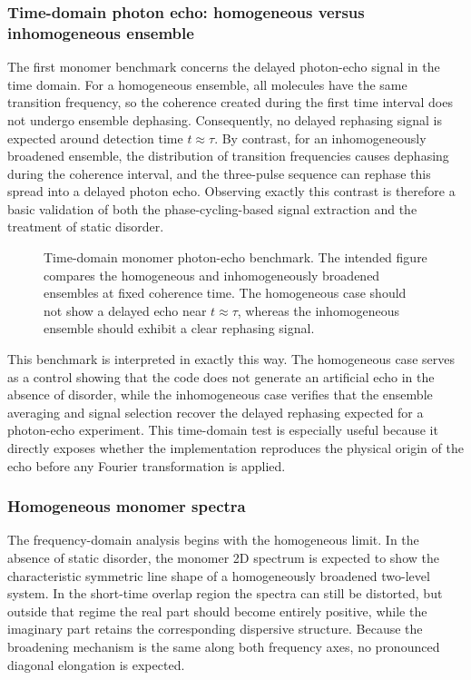 \subsubsection{Time-domain photon echo: homogeneous versus inhomogeneous ensemble}

The first monomer benchmark concerns the delayed photon-echo signal in the time
domain.
For a homogeneous ensemble, all molecules have the same transition frequency, so
the coherence created during the first time interval does not undergo ensemble
dephasing.
Consequently, no delayed rephasing signal is expected around detection time
$t\approx\tau$.
By contrast, for an inhomogeneously broadened ensemble, the distribution of
transition frequencies causes dephasing during the coherence interval, and the
three-pulse sequence can rephase this spread into a delayed photon echo.
Observing exactly this contrast is therefore a basic validation of both the
phase-cycling-based signal extraction and the treatment of static disorder.

\begin{figure}[htbp]
    \centering
    \caption{Time-domain monomer photon-echo benchmark.
    The intended figure compares the homogeneous and inhomogeneously broadened
    ensembles at fixed coherence time. The homogeneous case should not show a
    delayed echo near $t\approx\tau$, whereas the inhomogeneous ensemble should
    exhibit a clear rephasing signal.}
    \label{fig:rslts_monomer_echo_time_hom_vs_inhom}
\end{figure}

This benchmark is interpreted in exactly this way.
The homogeneous case serves as a control showing that the code does not generate
an artificial echo in the absence of disorder, while the inhomogeneous case
verifies that the ensemble averaging and signal selection recover the delayed
rephasing expected for a photon-echo experiment.
This time-domain test is especially useful because it directly exposes whether
the implementation reproduces the physical origin of the echo before any Fourier
transformation is applied.

\subsubsection{Homogeneous monomer spectra}

The frequency-domain analysis begins with the homogeneous limit.
In the absence of static disorder, the monomer 2D spectrum is expected to show
the characteristic symmetric line shape of a homogeneously broadened two-level
system.
In the short-time overlap region the spectra can still be distorted, but outside
that regime the real part should become entirely positive, while the imaginary
part retains the corresponding dispersive structure.
Because the broadening mechanism is the same along both frequency axes, no
pronounced diagonal elongation is expected.

